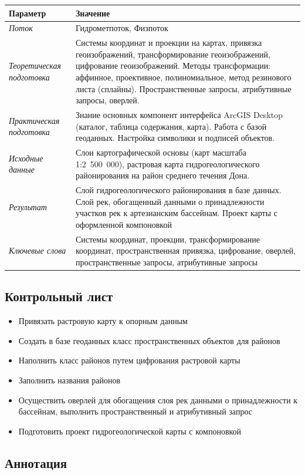 \documentclass[12pt,]{book}
\providecommand{\tightlist}{%
  \setlength{\itemsep}{0pt}\setlength{\parskip}{0pt}}
\begin{document}
\begin{longtable}[]{@{}ll@{}}
\toprule
Параметр & Значение\tabularnewline
\midrule
\endhead
\emph{Поток} & Гидрометпоток, Физпоток\tabularnewline
\emph{Теоретическая подготовка} & Системы координат и проекции на картах, привязка геоизображений, трансформирование геоизображений, цифрование геоизображений. Методы трансформации: аффинное, проективное, полиномиальное, метод резинового листа (сплайны). Пространственные запросы, атрибутивные запросы, оверлей.\tabularnewline
\emph{Практическая подготовка} & Знание основных компонент интерфейса ArcGIS Desktop (каталог, таблица содержания, карта). Работа с базой геоданных. Настройка символики и подписей объектов.\tabularnewline
\emph{Исходные данные} & Слои картографической основы (карт масштаба 1:2~500~000), растровая карта гидрогеологического районирования на район среднего течения Дона.\tabularnewline
\emph{Результат} & Слой гидрогеологического районирования в базе данных. Слой рек, обогащенный данными о принадлежности участков рек к артезианским бассейнам. Проект карты с оформленной компоновкой\tabularnewline
\emph{Ключевые слова} & Системы координат, проекции, трансформирование координат, пространственная привязка, цифрование, оверлей, пространственные запросы, атрибутивные запросы\tabularnewline
\bottomrule
\end{longtable}

\hypertarget{map-ref-hydrogeologic-control}{%
\subsection{Контрольный лист}\label{map-ref-hydrogeologic-control}}

\begin{itemize}
\tightlist
\item
  Привязать растровую карту к опорным данным
\item
  Создать в базе геоданных класс пространственных объектов для районов
\item
  Наполнить класс районов путем цифрования растровой карты
\item
  Заполнить названия районов
\item
  Осуществить оверлей для обогащения слоя рек данными о принадлежности к бассейнам, выполнить пространственный и атрибутивный запрос
\item
  Подготовить проект гидрогеологической карты с компоновкой
\end{itemize}

\hypertarget{map-ref-hydrogeologic-annotation}{%
\subsection{Аннотация}\label{map-ref-hydrogeologic-annotation}}
\end{document}

